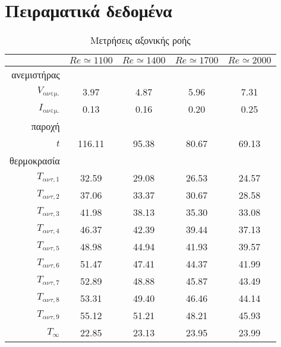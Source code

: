\chapter{Πειραματικά δεδομένα}\label{app:measurements}




\begin{table*}[h!]\centering
\caption{Μετρήσεις αξονικής ροής}\label{axialmeas}
\begin{adjustbox}{width=0.47\textheight}
\begin{threeparttable}
\begin{tabular}{@{}r *{4}{S[table-format=3.2, table-number-alignment = right]}@{}}\toprule
& {$Re \simeq 1100$} & {$Re \simeq 1400$} & {$Re \simeq 1700$} & {$Re \simeq 2000$}\\\midrule
ανεμιστήρας\tnote{*}\\
$\scriptstyle{V_{\text{ανεμ.}}}$ & 3.97 &  4.87 &  5.96 &  7.31 \\ 
$\scriptstyle{Ι_{\text{ανεμ.}}}$ & 0.13 &  0.16 &  0.20 &  0.25 \\
παροχή\tnote{\dag}\\
$t$ & 116.11 & 95.38 & 80.67 & 69.13\\
θερμοκρασία\tnote{\ddag}\\
$\scriptstyle{T_{αντ, 1}}$ & 32.59 & 29.08 & 26.53 & 24.57 \\ 
$\scriptstyle{T_{αντ, 2}}$ & 37.06 & 33.37 & 30.67 & 28.58 \\ 
$\scriptstyle{T_{αντ, 3}}$ & 41.98 & 38.13 & 35.30 & 33.08 \\ 
$\scriptstyle{T_{αντ, 4}}$ & 46.37 & 42.39 & 39.44 & 37.13 \\ 
$\scriptstyle{T_{αντ, 5}}$ & 48.98 & 44.94 & 41.93 & 39.57 \\
$\scriptstyle{T_{αντ, 6}}$ & 51.47 & 47.41 & 44.37 & 41.99 \\ 
$\scriptstyle{T_{αντ, 7}}$ & 52.89 & 48.88 & 45.87 & 43.49 \\ 
$\scriptstyle{T_{αντ, 8}}$ & 53.31 & 49.40 & 46.46 & 44.14 \\ 
$\scriptstyle{T_{αντ, 9}}$ & 55.12 & 51.21 & 48.21 & 45.93 \\ 
$\scriptstyle{T_{\infty}}$ & 22.85 & 23.13 & 23.95 & 23.99 \\ 

\end{tabular}
\end{threeparttable}
\end{adjustbox}
\end{table*}

